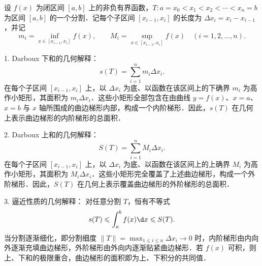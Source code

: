 \begin{solution}
    设 $f(x)$ 为闭区间 $[a, b]$ 上的非负有界函数，$T : a = x_0 < x_1 < x_2 < \cdots < x_n = b$ 为区间 $[a, b]$ 的一个分割．记每个子区间 $[x_{i-1}, x_i]$ 的长度为 $\Delta x_i = x_i - x_{i-1}$，并记
    \begin{equation}
        m_i = \inf_{x\in [x_{i-1}, x_i]} f(x), \qquad M_i = \sup_{x\in [x_{i-1}, x_i]} f(x) \quad (i = 1, 2, \dots, n).
    \end{equation}

    1. Darboux 下和的几何解释：
    \begin{equation}
        s(T) = \sum_{i=1}^n m_i \Delta x_i.
    \end{equation}
    在每个子区间 $[x_{i-1}, x_i]$ 上，以 $\Delta x_i$ 为底、以函数在该区间上的下确界 $m_i$ 为高作小矩形，其面积为 $m_i \Delta x_i$．这些小矩形全部包含在由曲线 $y = f(x)$、$x = a$、$x = b$ 与 $x$ 轴所围成的曲边梯形内部，构成一个内阶梯形．因此，$s(T)$ 在几何上表示曲边梯形的内阶梯形的总面积．

    2. Darboux 上和的几何解释：
    \begin{equation}
        S(T) = \sum_{i=1}^n M_i \Delta x_i.
    \end{equation}
    在每个子区间 $[x_{i-1}, x_i]$ 上，以 $\Delta x_i$ 为底、以函数在该区间上的上确界 $M_i$ 为高作小矩形，其面积为 $M_i \Delta x_i$．这些小矩形完全覆盖了上述曲边梯形，构成一个外阶梯形．因此，$S(T)$ 在几何上表示覆盖曲边梯形的外阶梯形的总面积．

    3. 逼近性质的几何解释：
    对任意分割 $T$，恒有不等式
    \begin{equation}
        s(T) \leqslant \int_a^b f(x) \d x \leqslant S(T).
    \end{equation}
    当分割逐渐细化，即分割细度 $\|T\| = \max_{1\leqslant i\leqslant n} \Delta x_i \to 0$ 时，内阶梯形由内向外逐渐充填曲边梯形，外阶梯形由外向内逐渐贴紧曲边梯形．若 $f(x)$ 可积，则上、下和的极限重合，曲边梯形的面积即为上、下积分的共同值．

    \begin{center}
\end{center}
\end{solution}
